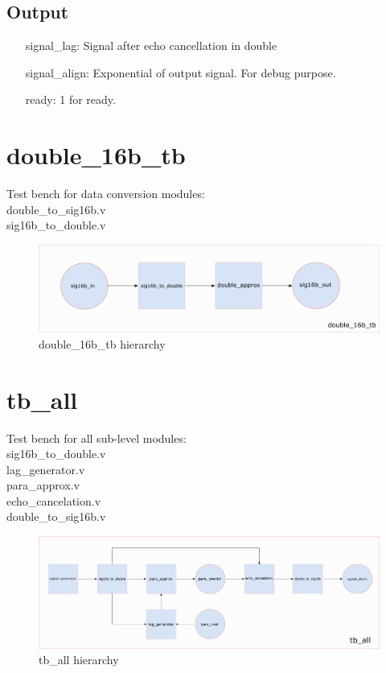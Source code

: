 \documentclass[twoside,a4paper]{refart}
\begin{document}
\subsection{Output}
\begin{itemize}
	\item[signal\_lag:] Signal after echo cancellation in double
	\item[signal\_align:] Exponential of output signal. For debug purpose.
	\item[ready:] 1 for ready.
\end{itemize}
\section{double\_16b\_tb}
Test bench for data conversion modules:\\
double\_to\_sig16b.v\\
sig16b\_to\_double.v\\
\begin{figure}[H]
	\centering
	\includegraphics[scale=1]{double_16b_tb.png}
	\caption{double\_16b\_tb hierarchy}
	\label{}
\end{figure}
\section{tb\_all}
Test bench for all sub-level modules:\\
sig16b\_to\_double.v\\
lag\_generator.v\\
para\_approx.v\\
echo\_cancelation.v\\
double\_to\_sig16b.v\\
\begin{figure}[H]
	\centering
	\includegraphics[scale=0.6]{tb_all.png}
	\caption{tb\_all hierarchy}
	\label{}
\end{figure}
\end{document}
